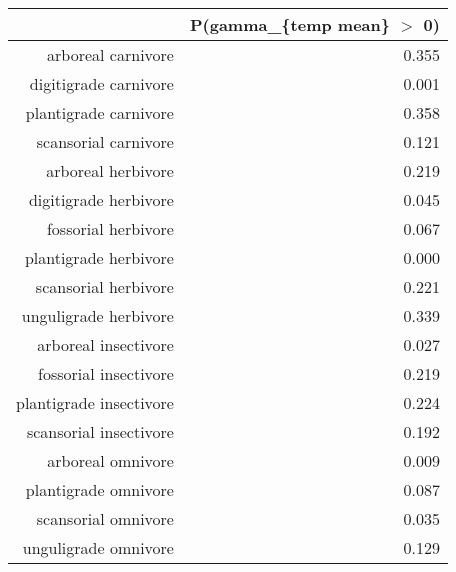\begin{table}[ht]
\centering
\begin{tabular}{rr}
  \hline
 & P(gamma\_\{temp mean\} $>$ 0) \\ 
  \hline
arboreal carnivore & 0.355 \\ 
  digitigrade carnivore & 0.001 \\ 
  plantigrade carnivore & 0.358 \\ 
  scansorial carnivore & 0.121 \\ 
  arboreal herbivore & 0.219 \\ 
  digitigrade herbivore & 0.045 \\ 
  fossorial herbivore & 0.067 \\ 
  plantigrade herbivore & 0.000 \\ 
  scansorial herbivore & 0.221 \\ 
  unguligrade herbivore & 0.339 \\ 
  arboreal insectivore & 0.027 \\ 
  fossorial insectivore & 0.219 \\ 
  plantigrade insectivore & 0.224 \\ 
  scansorial insectivore & 0.192 \\ 
  arboreal omnivore & 0.009 \\ 
  plantigrade omnivore & 0.087 \\ 
  scansorial omnivore & 0.035 \\ 
  unguligrade omnivore & 0.129 \\ 
   \hline
\end{tabular}
\label{tab:origin_temp}
\end{table}
